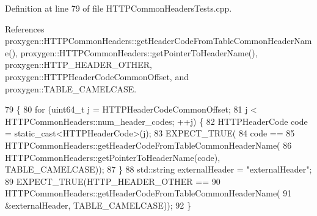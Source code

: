 Definition at line 79 of file H\+T\+T\+P\+Common\+Headers\+Tests.\+cpp.



References proxygen\+::\+H\+T\+T\+P\+Common\+Headers\+::get\+Header\+Code\+From\+Table\+Common\+Header\+Name(), proxygen\+::\+H\+T\+T\+P\+Common\+Headers\+::get\+Pointer\+To\+Header\+Name(), proxygen\+::\+H\+T\+T\+P\+\_\+\+H\+E\+A\+D\+E\+R\+\_\+\+O\+T\+H\+ER, proxygen\+::\+H\+T\+T\+P\+Header\+Code\+Common\+Offset, and proxygen\+::\+T\+A\+B\+L\+E\+\_\+\+C\+A\+M\+E\+L\+C\+A\+SE.


\begin{DoxyCode}
79                                                                            \{
80   \textcolor{keywordflow}{for} (uint64\_t j = HTTPHeaderCodeCommonOffset;
81        j < HTTPCommonHeaders::num\_header\_codes; ++j) \{
82     HTTPHeaderCode code = \textcolor{keyword}{static\_cast<}HTTPHeaderCode\textcolor{keyword}{>}(j);
83     EXPECT\_TRUE(
84       code ==
85       HTTPCommonHeaders::getHeaderCodeFromTableCommonHeaderName(
86         HTTPCommonHeaders::getPointerToHeaderName(code), TABLE_CAMELCASE));
87   \}
88   std::string externalHeader = \textcolor{stringliteral}{"externalHeader"};
89   EXPECT\_TRUE(HTTP_HEADER_OTHER ==
90     HTTPCommonHeaders::getHeaderCodeFromTableCommonHeaderName(
91       &externalHeader, TABLE_CAMELCASE));
92 \}
\end{DoxyCode}
